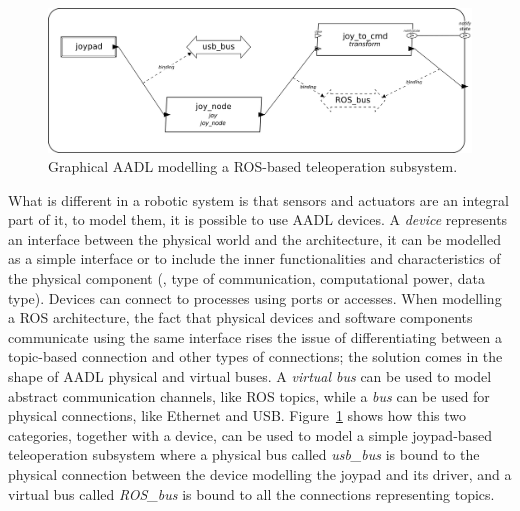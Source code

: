 \begin{figure}[t]
    \centering
    \includegraphics[width=\textwidth]{gfx/mini_arch}
    \caption{Graphical AADL modelling a ROS-based teleoperation subsystem.}\label{fig:mini-arch}
\end{figure}

What is different in a robotic system is that sensors and actuators are an integral part of it, to model them, it is possible to use AADL devices. A \textit{device} represents an interface between the physical world and the architecture, it can be modelled as a simple interface or to include the inner functionalities and characteristics of the physical component (\eg, type of communication, computational power, data type).  Devices can connect to processes using ports or accesses. When modelling a ROS architecture, the fact that physical devices and software components communicate using the same interface rises the issue of differentiating between a topic-based connection and other types of connections; the solution comes in the shape of AADL physical and virtual buses. A \textit{virtual bus} can be used to model abstract communication channels, like ROS topics, while a \textit{bus} can be used for physical connections, like Ethernet and USB. Figure~\ref{fig:mini-arch} shows how this two categories, together with a device, can be used to model a simple joypad-based teleoperation subsystem where a physical bus called \textit{usb\_bus} is bound to the physical connection between the device modelling the joypad and its driver, and a virtual bus called \textit{ROS\_bus} is bound to all the connections representing topics.

